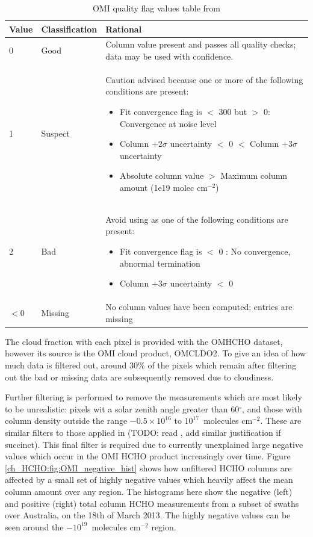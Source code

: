     \begin{table}
    \begin{tabular}{ | l | l | p{10cm} |}
      \hline
      \textbf{Value} & \textbf{Classification} & \textbf{Rational} 
      \\ \hline
      0 & Good & Column value present and passes all quality checks; data may be used with confidence. 
      \\ \hline
      1 & Suspect & Caution advised because one or more of the following conditions are present: 
        \begin{itemize}
          \item Fit convergence flag is $<$ 300 but $>$ 0: Convergence at noise level
          \item Column $+ 2 \sigma$ uncertainty $<$ 0 $<$ Column $ + 3 \sigma $ uncertainty
          \item Absolute column value $>$ Maximum column amount (1e19 molec cm$^{-2}$)
        \end{itemize}
      \\ \hline
      2 & Bad & Avoid using as one of the following conditions are present: 
        \begin{itemize}
          \item Fit convergence flag is $<$ 0 : No convergence, abnormal termination
          \item Column $+ 3 \sigma$ uncertainty $<$ 0
        \end{itemize}
      \\ \hline
      $<0$ & Missing & No column values have been computed; entries are missing
      \\ \hline
    \end{tabular}
    \caption{OMI quality flag values table from \citet{Kurosu2014}}
    \label{ch_HCHO:tab:OMIQualityFlag}
    \end{table}
    
    The cloud fraction with each pixel is provided with the OMHCHO dataset, however its source is the OMI cloud product, OMCLDO2.
    To give an idea of how much data is filtered out, around 30\% of the pixels which remain after filtering out the bad or missing data are subsequently removed due to cloudiness.
    
    Further filtering is performed to remove the measurements which are most likely to be unrealistic: pixels wit a solar zenith angle greater than 60$^\circ$, and those with column density outside the range $-0.5 \times 10^{16}$ to $10^{17} $~molecules cm$^{-2}$.
    These are similar filters to those applied in (TODO: read \citet{Zhu2016}, add similar justification if succinct).
    This final filter is required due to currently unexplained large negative values which occur in the OMI HCHO product increasingly over time.
    Figure \ref{ch_HCHO:fig:OMI_negative_hist} shows how unfiltered HCHO columns are affected by a small set of highly negative values which heavily affect the mean column amount over any region.
    The histograms here show the negative (left) and positive (right) total column HCHO measurements from a subset of swaths over Australia, on the 18th of March 2013.
    The highly negative values can be seen around the $-10^{19}$~molecules cm$^{-2}$ region.
    
